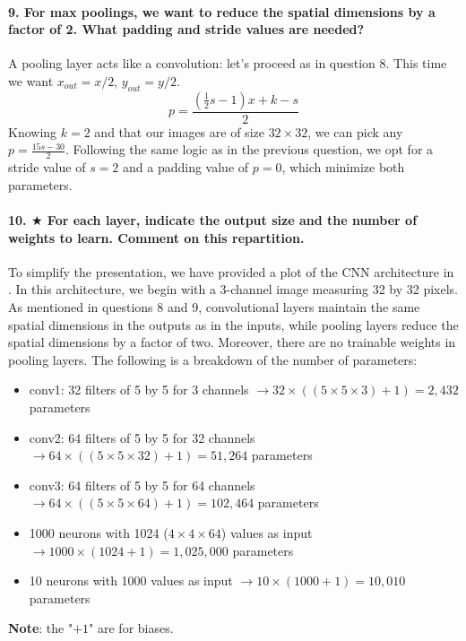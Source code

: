 \paragraph{9. For max poolings, we want to reduce the spatial dimensions by a factor of 2. What padding and stride values are needed?}
A pooling layer acts like a convolution: let's proceed as in question 8. This time we want $ x_{out} = x/2$, $ y_{out} = y/2 $.
\[
    p = \frac{(\frac{1}{2}s - 1) x + k - s}{2}
\]
Knowing $k = 2$ and that our images are of size $32 \times 32 $, we can pick any $p = \frac{15s - 30}{2}$. Following the same logic as in the previous question, we opt for a stride value of $ s = 2 $ and a padding value of $ p = 0 $, which minimize both parameters.

\paragraph{10. $ \bigstar $ For each layer, indicate the output size and the number of weights to learn. Comment on this repartition.}
To simplify the presentation, we have provided a plot of the CNN architecture in . In this architecture, we begin with a 3-channel image measuring 32 by 32 pixels. As mentioned in questions 8 and 9, convolutional layers maintain the same spatial dimensions in the outputs as in the inputs, while pooling layers reduce the spatial dimensions by a factor of two. Moreover, there are no trainable weights in pooling layers. The following is a breakdown of the number of parameters:
\begin{itemize}
    \item conv1: 32 filters of 5 by 5 for 3 channels $\rightarrow 32 \times ((5\times 5\times 3) + 1) = 2,432$ parameters
    \item conv2: 64 filters of 5 by 5 for 32 channels $\rightarrow 64\times ((5\times 5\times 32) + 1) = 51,264$ parameters
    \item conv3: 64 filters of 5 by 5 for 64 channels $\rightarrow 64\times ((5\times 5\times 64) + 1) = 102,464$ parameters
    \item 1000 neurons with 1024 ($4 \times 4 \times 64$) values as input $\rightarrow 1000 \times (1024 + 1) = 1,025,000$ parameters
    \item 10 neurons with 1000 values as input $\rightarrow 10 \times (1000 + 1) = 10,010$ parameters
\end{itemize}

\noindent \textbf{Note}: the "$+1$" are for biases.\\

